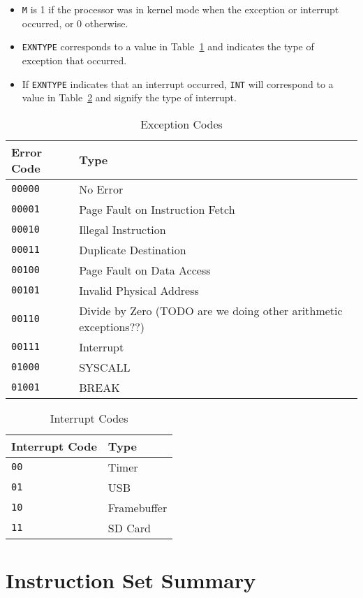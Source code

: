 \documentclass[11pt,openany]{report}
\begin{document}
\begin{itemize}
  \item \texttt{M} is 1 if the processor was in kernel mode when the exception or interrupt occurred, or 0 otherwise.
  \item \texttt{EXNTYPE} corresponds to a value in Table~\ref{tab:exncodes} and indicates the type of exception that occurred.
  \item If \texttt{EXNTYPE} indicates that an interrupt occurred, \texttt{INT} will correspond to a value in Table~\ref{tab:intcodes} and signify the type of interrupt.
\end{itemize}

\begin{table}[!h]
\begin{tabular}{l|l}
Error Code & Type\\
\hline
\texttt{00000} & No Error\\
\texttt{00001} & Page Fault on Instruction Fetch\\
\texttt{00010} & Illegal Instruction\\
\texttt{00011} & Duplicate Destination\\
\texttt{00100} & Page Fault on Data Access\\
\texttt{00101} & Invalid Physical Address\\
\texttt{00110} & Divide by Zero (TODO are we doing other arithmetic exceptions??)\\
\texttt{00111} & Interrupt\\
\texttt{01000} & SYSCALL\\
\texttt{01001} & BREAK
\end{tabular}
\caption{Exception Codes}
\label{tab:exncodes}
\end{table}

\begin{table}[!h]
\begin{tabular}{l|l}
Interrupt Code & Type\\
\hline
\texttt{00} & Timer\\
\texttt{01} & USB\\
\texttt{10} & Framebuffer\\
\texttt{11} & SD Card
\end{tabular}
\caption{Interrupt Codes}
\label{tab:intcodes}
\end{table}



\chapter{Instruction Set Summary}
\end{document}
